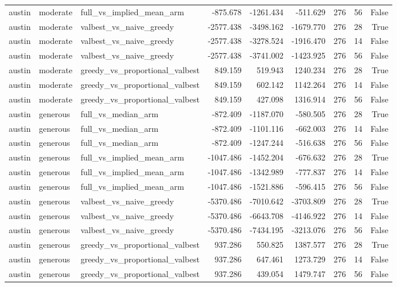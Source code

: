 \begin{tabular}{lllrrrrrr}
austin & moderate & full\_vs\_implied\_mean\_arm & -875.678 & -1261.434 & -511.629 & 276 & 56 & False \\
austin & moderate & valbest\_vs\_naive\_greedy & -2577.438 & -3498.162 & -1679.770 & 276 & 28 & True \\
austin & moderate & valbest\_vs\_naive\_greedy & -2577.438 & -3278.524 & -1916.470 & 276 & 14 & False \\
austin & moderate & valbest\_vs\_naive\_greedy & -2577.438 & -3741.002 & -1423.925 & 276 & 56 & False \\
austin & moderate & greedy\_vs\_proportional\_valbest & 849.159 & 519.943 & 1240.234 & 276 & 28 & True \\
austin & moderate & greedy\_vs\_proportional\_valbest & 849.159 & 602.142 & 1142.264 & 276 & 14 & False \\
austin & moderate & greedy\_vs\_proportional\_valbest & 849.159 & 427.098 & 1316.914 & 276 & 56 & False \\
austin & generous & full\_vs\_median\_arm & -872.409 & -1187.070 & -580.505 & 276 & 28 & True \\
austin & generous & full\_vs\_median\_arm & -872.409 & -1101.116 & -662.003 & 276 & 14 & False \\
austin & generous & full\_vs\_median\_arm & -872.409 & -1247.244 & -516.638 & 276 & 56 & False \\
austin & generous & full\_vs\_implied\_mean\_arm & -1047.486 & -1452.204 & -676.632 & 276 & 28 & True \\
austin & generous & full\_vs\_implied\_mean\_arm & -1047.486 & -1342.989 & -777.837 & 276 & 14 & False \\
austin & generous & full\_vs\_implied\_mean\_arm & -1047.486 & -1521.886 & -596.415 & 276 & 56 & False \\
austin & generous & valbest\_vs\_naive\_greedy & -5370.486 & -7010.642 & -3703.809 & 276 & 28 & True \\
austin & generous & valbest\_vs\_naive\_greedy & -5370.486 & -6643.708 & -4146.922 & 276 & 14 & False \\
austin & generous & valbest\_vs\_naive\_greedy & -5370.486 & -7434.195 & -3213.076 & 276 & 56 & False \\
austin & generous & greedy\_vs\_proportional\_valbest & 937.286 & 550.825 & 1387.577 & 276 & 28 & True \\
austin & generous & greedy\_vs\_proportional\_valbest & 937.286 & 647.461 & 1273.729 & 276 & 14 & False \\
austin & generous & greedy\_vs\_proportional\_valbest & 937.286 & 439.054 & 1479.747 & 276 & 56 & False \\

\end{tabular}
